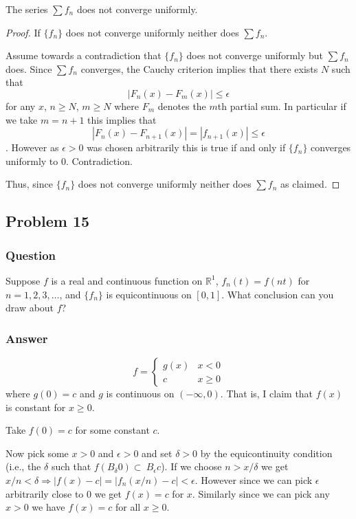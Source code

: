 \documentclass[12pt]{article}
\begin{document}
The series $\sum f_n$ does not converge uniformly. 
\begin{proof}
If $\{f_n\}$ does not converge uniformly neither does $\sum f_n$. 

Assume towards a contradiction that $\{f_n\}$ does not converge uniformly but $\sum f_n$ does. Since $\sum f_n$ converges, the Cauchy criterion implies that there exists $N$ such that
\[\left| F_n(x) -F_m(x) \right| \leq \epsilon\] 
for any $x$, $n \geq N $, $m \geq N$ where $F_m$ denotes the $m$th partial sum. In particular if we take $m = n+1$ this implies that
\[\left| F_n(x) -F_{n+1}(x) \right| = \left| f_{n+1}(x) \right| \leq \epsilon\] .
However as $\epsilon >0 $ was chosen arbitrarily this is true if and only if $\{f_n\}$ converges uniformly to 0. Contradiction.

Thus, since $\{f_n\}$ does not converge uniformly neither does $\sum f_n$ as claimed.
\end{proof}

\subsection{Problem 15}
\subsubsection{Question}
Suppose $f$ is a real and continuous function on $\mathbb{R}^1$, $f_n(t)=f(n t)$ for $n = 1,2,3,\dots$, and $\{f_n\}$ is equicontinuous on $[0,1]$. What conclusion can you draw about $f$?
\subsubsection{Answer}
\[f=\left\{ \begin{array}{ll} g(x) & x<0 \\ c & x \geq 0 \end{array} \right. \]
where $g(0)=c$ and $g$ is continuous on $(-\infty,0)$. That is, I claim that $f(x)$ is constant for $x \geq 0$.

Take $f(0)=c$ for some constant $c$. 

Now pick some $x>0$ and  $\epsilon > 0$ and set  $\delta >0$ by the equicontinuity condition (i.e., the $\delta$ such that $f(B_\delta 0) \subset \ B_\epsilon c $). If we choose $n > x / \delta$  we get $x/n < \delta \Rightarrow \left| f(x) - c\right| = \left| f_n(x/n) -c \right| < \epsilon$. However since we can pick $\epsilon$ arbitrarily close to 0 we get $f(x) =c $ for  $x$. Similarly since we can pick any $x > 0$ we have $f(x) = c$ for all $x \geq 0$.
\end{document}

